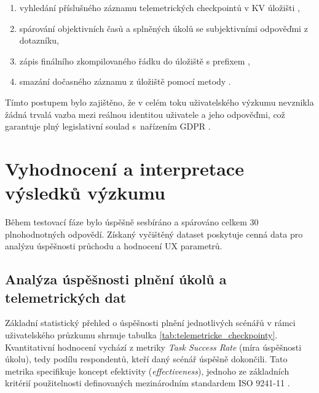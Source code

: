 \documentclass[male,czech,api_bc]{kitheses}
\begin{document}
\begin{enumerate}
    \item vyhledání příslušného záznamu telemetrických checkpointů v KV úložišti ,
    
    \item spárování objektivních časů a splněných úkolů se subjektivními odpověďmi z dotazníku,
    
    \item zápis finálního zkompilovaného řádku do úložiště s prefixem ,
    
    \item smazání dočasného záznamu z úložiště pomocí metody .
\end{enumerate}

Tímto postupem bylo zajištěno, že v celém toku uživatelského výzkumu nevznikla žádná trvalá vazba mezi reálnou identitou uživatele a jeho odpověďmi, což garantuje plný legislativní soulad s~nařízením GDPR \cite{Paisner25cervence2017,GDPR2016}.

\section{Vyhodnocení a interpretace výsledků výzkumu}
\label{sec:vyhodnoceni_vysledku}

Během testovací fáze bylo úspěšně sesbíráno a spárováno celkem 30 plnohodnotných odpovědí. Získaný vyčištěný dataset poskytuje cenná data pro analýzu úspěšnosti průchodu a hodnocení UX parametrů.

\subsection{Analýza úspěšnosti plnění úkolů a telemetrických dat}
\label{subsec:uspesnost_ukolu}

Základní statistický přehled o úspěšnosti plnění jednotlivých scénářů v rámci uživatelského průzkumu shrnuje tabulka \vref{tab:telemetricke_checkpointy}. Kvantitativní hodnocení vychází z metriky \textit{Task Success Rate} (míra úspěšnosti úkolu), tedy podílu respondentů, kteří daný scénář úspěšně dokončili. Tato metrika specifikuje koncept efektivity (\textit{effectiveness}), jednoho ze základních kritérií použitelnosti definovaných mezinárodním standardem ISO 9241-11 \cite{Iso9241}.
\end{document}
